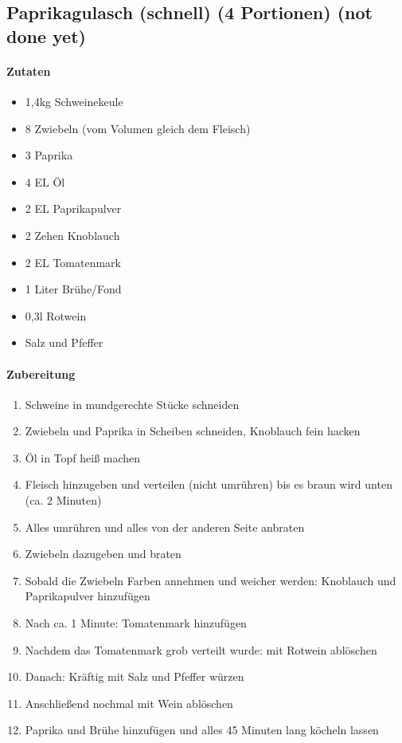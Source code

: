 \newpage
\subsection{Paprikagulasch (schnell) (4 Portionen) (not done yet)}
\paragraph{Zutaten}
\begin{itemize}[noitemsep]
	\item 1,4kg Schweinekeule
	\item 8 Zwiebeln (vom Volumen gleich dem Fleisch)
	\item 3 Paprika
	\item 4 EL Öl
	\item 2 EL Paprikapulver
	\item 2 Zehen Knoblauch
	\item 2 EL Tomatenmark
	\item 1 Liter Brühe/Fond
	\item 0,3l Rotwein
	\item Salz und Pfeffer
\end{itemize}
\paragraph{Zubereitung}
\begin{enumerate}[noitemsep]
	\item Schweine in mundgerechte Stücke schneiden
	\item Zwiebeln und Paprika in Scheiben schneiden, Knoblauch fein hacken
	\item Öl in Topf heiß machen
	\item Fleisch hinzugeben und verteilen (nicht umrühren) bis es braun wird unten (ca. 2 Minuten)
	\item Alles umrühren und alles von der anderen Seite anbraten
	\item Zwiebeln dazugeben und braten
	\item Sobald die Zwiebeln Farben annehmen und weicher werden: Knoblauch und Paprikapulver hinzufügen
	\item Nach ca. 1 Minute: Tomatenmark hinzufügen
	\item Nachdem das Tomatenmark grob verteilt wurde: mit Rotwein ablöschen
	\item Danach: Kräftig mit Salz und Pfeffer würzen 
	\item Anschließend nochmal mit Wein ablöschen
	\item Paprika und Brühe hinzufügen und alles 45 Minuten lang köcheln lassen
\end{enumerate}